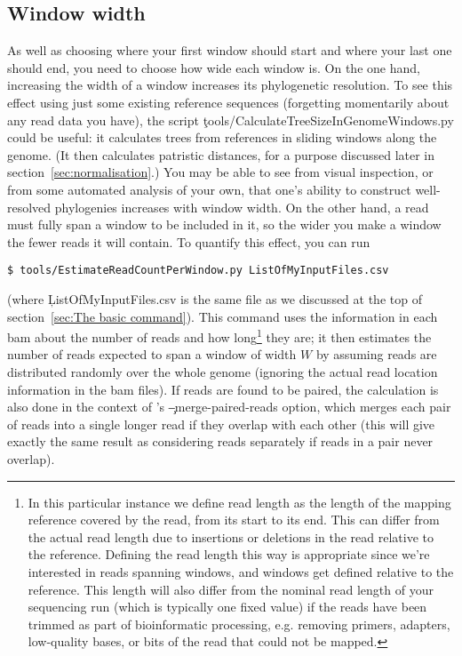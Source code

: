 \subsection{Window width} \label{sec:WindowWidth}
As well as choosing where your first window should start and where your last one should end, you need to choose how wide each window is.
On the one hand, increasing the width of a window increases its phylogenetic resolution.
To see this effect using just some existing reference sequences (forgetting momentarily about any read data you have), the script \c{tools/CalculateTreeSizeInGenomeWindows.py} could be useful: it calculates trees from references in sliding windows along the genome.
(It then calculates patristic distances, for a purpose discussed later in section~\ref{sec:normalisation}.)
You may be able to see from visual inspection, or from some automated analysis of your own, that one's ability to construct well-resolved phylogenies increases with window width.
On the other hand, a read must fully span a window to be included in it, so the wider you make a window the fewer reads it will contain.
To quantify this effect, you can run
\begin{verbatim}
$ tools/EstimateReadCountPerWindow.py ListOfMyInputFiles.csv
\end{verbatim}
(where \c{ListOfMyInputFiles.csv} is the same file as we discussed at the top of section~\ref{sec:The basic command}).
This command uses the information in each bam about the number of reads and how long\footnote{
In this particular instance we define read length as the length of the mapping reference covered by the read, from its start to its end.
This can differ from the actual read length due to insertions or deletions in the read relative to the reference.
Defining the read length this way is appropriate since we're interested in reads spanning windows, and windows get defined relative to the reference.
This length will also differ from the nominal read length of your sequencing run (which is typically one fixed value) if the reads have been trimmed as part of bioinformatic processing, e.g. removing primers, adapters, low-quality bases, or bits of the read that could not be mapped.
} they are; it then estimates the number of reads expected to span a window of width $W$ by assuming reads are distributed randomly over the whole genome (ignoring the actual read location information in the bam files).
If reads are found to be paired, the calculation is also done in the context of \pmt's \c{--merge-paired-reads} option, which merges each pair of reads into a single longer read if they overlap with each other (this will give exactly the same result as considering reads separately if reads in a pair never overlap).
